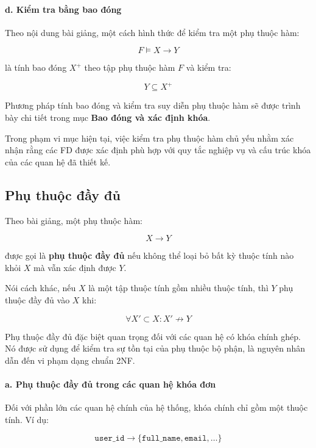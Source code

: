 \paragraph{d. Kiểm tra bằng bao đóng}\mbox{}\par

Theo nội dung bài giảng, một cách hình thức để kiểm tra một phụ thuộc hàm:

$$F \models X \rightarrow Y$$

là tính bao đóng $X^+$ theo tập phụ thuộc hàm $F$ và kiểm tra:

$$Y \subseteq X^+$$

Phương pháp tính bao đóng và kiểm tra suy diễn phụ thuộc hàm sẽ được trình bày chi tiết trong mục \textbf{Bao đóng và xác định khóa}.

Trong phạm vi mục hiện tại, việc kiểm tra phụ thuộc hàm chủ yếu nhằm xác nhận rằng các FD được xác định phù hợp với quy tắc nghiệp vụ và cấu trúc khóa của các quan hệ đã thiết kế.

\subsection{Phụ thuộc đầy đủ}\mbox{}\par

Theo bài giảng, một phụ thuộc hàm:

$$X \rightarrow Y$$

được gọi là \textbf{phụ thuộc đầy đủ} nếu không thể loại bỏ bất kỳ thuộc tính nào khỏi $X$ mà vẫn xác định được $Y$.

Nói cách khác, nếu $X$ là một tập thuộc tính gồm nhiều thuộc tính, thì $Y$ phụ thuộc đầy đủ vào $X$ khi:

$$\forall X' \subset X: X' \not\rightarrow Y$$

Phụ thuộc đầy đủ đặc biệt quan trọng đối với các quan hệ có khóa chính ghép. Nó được sử dụng để kiểm tra sự tồn tại của phụ thuộc bộ phận, là nguyên nhân dẫn đến vi phạm dạng chuẩn 2NF.

\paragraph{a. Phụ thuộc đầy đủ trong các quan hệ khóa đơn}\mbox{}\par

Đối với phần lớn các quan hệ chính của hệ thống, khóa chính chỉ gồm một thuộc tính. Ví dụ:

$$
\texttt{user\_id}
\rightarrow
\{
\texttt{full\_name},
\texttt{email},
\ldots
\}
$$

